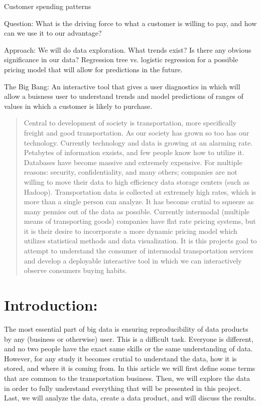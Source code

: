 \documentclass{article}\usepackage[]{graphicx}\usepackage[]{color}
\begin{document}
Customer spending patterns 

Question: What is the driving force to what a customer is willing to pay, and how can we use it to our advantage?

Approach: We will do data exploration. What trends exist? Is there any obvious significance in our data? Regression tree vs. logistic regression for a possible pricing model that will allow for predictions in the future.

The Big Bang: An interactive tool that gives a user diagnostics in which will allow a buisness user to understand trends and model predictions of ranges of values in which a customer is likely to purchase.

\begin{abstract}
Central to development of society is transportation, more specifically freight and good transportation. As our society has grown so too has our technology. Currently technology and data is growing at an alarming rate. Petabytes of information exsists, and few people know how to utilize it. Databases have become massive and extremely expensive. For multiple reasons: security, confidentiality, and many others; companies are not willing to move their data to high efficiency data storage centers (such as Hadoop). Transportation data is collected at extremely high rates, which is more than a single person can analyze. It has become crutial to squeeze as many pennies out of the data as possible. Currently intermodal (multiple means of transporting goods) companies have flat rate pricing systems, but it is their desire to incorrporate a more dynamic pricing model which utilizes statistical methods and data visualization. It is this projects goal to attempt to understand the consumer of intermodal transportation services and develop a deployable interactive tool in which we can interactively observe consumers buying habits.
\end{abstract}

\section{Introduction:}
The most essential part of big data is ensuring reproducibility of data products by any (business or otherwise) user. This is a difficult task. Everyone is different, and no two people have the exact same skills or the same understanding of data. However, for any study it becomes crutial to understand the data, how it is stored, and where it is coming from. In this article we will first define some terms that are common to the transportation business. Then, we will explore the data in order to fully understand everything that will be presented in this project. Last, we will analyze the data, create a data product, and will discuss the results. \\
\end{document}

